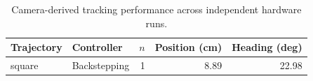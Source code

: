 \begin{table}[!t]
\centering
\caption{Camera-derived tracking performance across independent hardware runs.}
\label{tab:tracking}
\begin{tabular}{llrrr}
\hline
Trajectory & Controller & $n$ & Position (cm) & Heading (deg) \\
\hline
square & Backstepping & 1 & 8.89 & 22.98 \\
\hline
\end{tabular}
\end{table}
